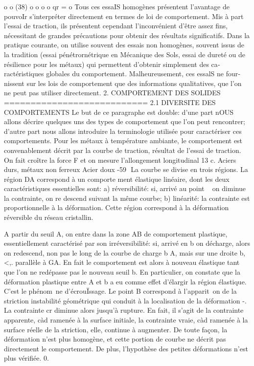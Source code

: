 o o 
(38) 
o o o o 
qr =
o 
Tous ces essaIS homogènes présentent l'avantage de pouvoIr s'inter­préter directement en termes de loi de comportement. Mis à part l'essai de traction, ils présentent cependant l'inconvénient d'être assez fins, nécessi­tant de grandes précautions pour obtenir des résultats significatifs. Dans la pratique courante, on utilise souvent des essais non homogènes, souvent issus de la tradition (essai pénétrornétrique en Mécanique des Sols, essai de dureté ou de résilience pour les métaux) qui permettent d'obtenir simplement des ca­ractéristiques globales du comportement. Malheureusement, ces essalS ne four­nissent sur les lois de comportement que des informations qualitatives, que l'on ne peut pas utiliser directement. 
2. COMPORTEMENT DES SOLIDES 
=========================== 
2.1 DIVERSITE DES COMPORTEMENTS 
Le but de ce paragraphe est double: d'une part nOUS allons décrire quelques uns des types de comportement que l'on peut rencontrer; d'autre part nous allons introduire la terminologie utilisée pour caractériser ces compor­tements. 
Pour les métaux à température ambiante, le comportement est convena­blement décrit par la courbe de traction, résultat de l'essai de traction. On fait croître la force F et on mesure l'allongement longitudinal 
13 
c. 
Aciers durs, métaux non ferreux
Acier doux 
-59 ­
La courbe se divise en trois régions. La région DA correspond à un comporte­
ment élastique linéaire, dont les deux caractéristiques essentielles sont: 
a) réversibilité: si, arrivé au point ~ on diminue la contrainte, on re­
descend suivant la même courbe; 
b) linéarité: la contrainte est proportionnelle à la déformation. 
Cette région correspond à la déformation réversible du réseau cristallin. 

A partir du seuil A, on entre dans la zone AB de comportement plastique, essentiellement caractérisé par son irréversibilité: si, arrivé en b on décharge, alors on redescend, non pas le long de la courbe de char­ge b A, mais sur une droite b,<,. parallèle à GA. En fait le comportement est alors à nouveau élastique tant que l'on ne redépasse pas le nouveau seuil 
b. En particulier, on constate que la déformation plastique entre A et b a eu comme effet d'élargir la région élastique. C'est le phénom~ne d'écrouÏs­sage. 
Le point B correspond à l'apparit~on de la striction instabilité géométrique qui conduit à la localisation de la déformation -. La contrainte cr diminue alors jusqu'à rupture. En fait, il s'agit de la contrainte appa­rente, càd ramenée à la surface initiale, la contrainte vraie, càd ramenée à la surface réelle de la striction, elle, continue à augmenter. De toute façon, la déformation n'est plus homogène, et cette portion de courbe ne décrit pas directement le comportement. De plus, l'hypothèse des petites dé­formations n'est plus vérifiée. 
0. 

